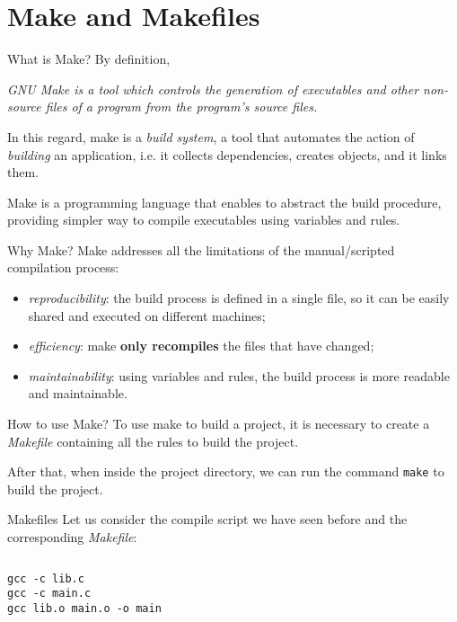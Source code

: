 \section{Make and Makefiles}

\begin{frame}{What is Make?}
    By definition,
    \begin{center}
        \itshape
        \alert{GNU Make} is a tool which controls the generation of executables and other non-source files of a program from the program's source files.
    \end{center}

    In this regard, make is a \emph{build system}, a tool that automates the action of \textit{building} an application, i.e. it collects dependencies, creates objects, and it links them. 

    Make is a programming language that enables to abstract the build procedure, providing simpler way to compile executables using variables and rules.
\end{frame}

\begin{frame}{Why Make?}
    Make addresses all the limitations of the manual/scripted compilation process:
    \begin{itemize}
        \item \emph{reproducibility}: the build process is defined in a single file, so it can be easily shared and executed on different machines;
        \item \emph{efficiency}: make \textbf{only recompiles} the files that have changed;
        \item \emph{maintainability}: using variables and rules, the build process is more readable and maintainable.
    \end{itemize}
\end{frame}

\begin{frame}{How to use Make?}
    To use make to build a project, it is necessary to create a \emph{Makefile} containing all the rules to build the project.

    After that, when inside the project directory, we can run the command \texttt{make} to build the project.
\end{frame}

\begin{frame}[fragile]{Makefiles}
    Let us consider the compile script we have seen before and the corresponding \textit{Makefile}:
    \begin{columns}[c]
      \begin{column}{0.48\textwidth}
        \begin{lstlisting}
gcc -c lib.c 
gcc -c main.c 
gcc lib.o main.o -o main \end{lstlisting}
      \end{column}
      \begin{column}{0.48\textwidth}
          
      \end{column}
    \end{columns}

\end{frame}

